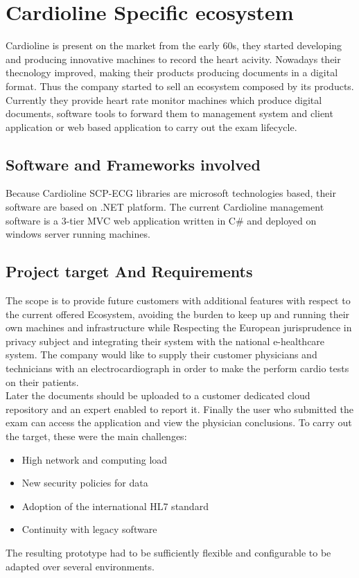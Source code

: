 \chapter{Cardioline Specific ecosystem}
\label{chapter:cardioline_specific_ecosystem}
Cardioline is present on the market from the early 60s, they started developing and producing innovative machines to record the heart acivity. Nowadays their thecnology improved, making their products producing documents in a digital format.
Thus the company started to sell an ecosystem composed by its products. Currently they provide heart rate monitor machines which produce digital documents, software tools to forward them to management system and client application or web based application to carry out the exam lifecycle.

\section{Software and Frameworks involved}
Because Cardioline SCP-ECG libraries are microsoft technologies based, their software are based on .NET platform.
The current Cardioline management software is a 3-tier MVC web application written in C\# and deployed on windows server running machines.

\section{Project target And Requirements}
The scope is to provide future customers with additional features with respect to the current offered Ecosystem, avoiding the burden to keep up and running their own machines and infrastructure while Respecting the European jurisprudence in privacy subject and integrating their system with the national e-healthcare system. The company would like to supply their customer physicians and technicians with an electrocardiograph in order to make the perform cardio tests on their patients.\\
Later the documents should be uploaded to a customer dedicated cloud repository and an expert enabled to report it. Finally the user who submitted the exam can access the application and view the physician conclusions.
To carry out the target, these were the main challenges:
\begin{itemize}
    \item High network and computing load
    \item New security policies for data
    \item Adoption of the international HL7 standard
    \item Continuity with legacy software
\end{itemize}
The resulting prototype had to be sufficiently flexible and configurable to be adapted over several environments.

